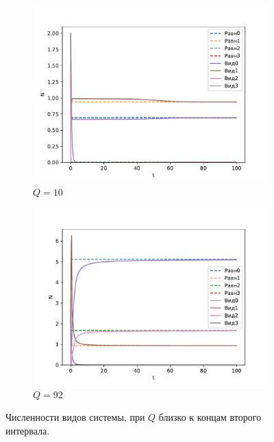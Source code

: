 \begin{figure}[H]
    \centering
    \begin{subfigure}[t]{.45\linewidth}
        \centering
        \includegraphics[width=\textwidth]{pictures/cycle/exp1_Q10.pdf}
        \caption{\(Q = 10\)}
    \end{subfigure}
    \begin{subfigure}[t]{.45\linewidth}
            \centering
            \includegraphics[width=\textwidth]{pictures/cycle/exp1_Q92.pdf}
            \caption{\(Q = 92\)}
        \end{subfigure}
    \caption{Численности видов системы, при \(Q\) близко к концам второго интервала.}  \label{fig:cycle_exp1_q2}
\end{figure}


